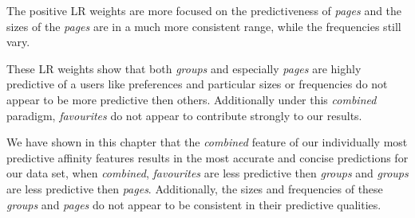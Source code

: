 The positive LR weights are more focused on the predictiveness of \emph{pages} and the sizes of the \emph{pages} are in
a much more consistent range, while the frequencies still vary.

These LR weights show that both \emph{groups} and especially \emph{pages} are highly predictive of a users like preferences and particular 
sizes or frequencies do not appear to be more predictive then others. Additionally under this \emph{combined} paradigm, \emph{favourites} do not appear 
to contribute strongly to our results.

We have shown in this chapter that the \emph{combined} feature of our individually most predictive affinity features results in the most 
accurate and concise predictions for our data set, when \emph{combined}, \emph{favourites} are less predictive then \emph{groups} and 
\emph{groups} are less predictive then \emph{pages}. Additionally, the sizes and frequencies of these \emph{groups} and \emph{pages} 
do not appear to be consistent in their predictive qualities.

